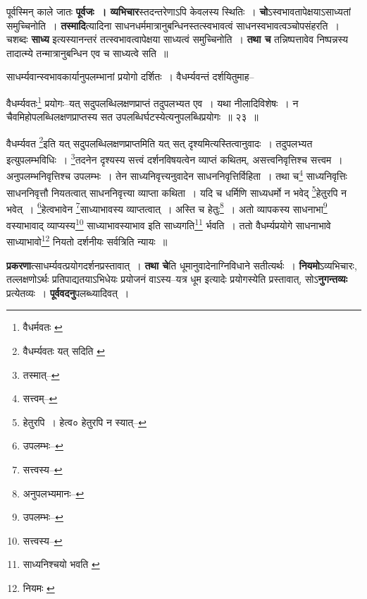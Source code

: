 \documentclass[article,12pt,a4paper]{memoir}
\begin{document}
	  \pstart पूर्वस्मिन् काले जातः \textbf{पूर्वजः । व्यभिचार}स्तदन्तरेणाऽपि केवलस्य स्थितिः । \textbf{चो}ऽस्वभावतापेक्षयाऽसाध्यतां समुच्चिनोति । \textbf{तस्मादि}त्यादिना साधनधर्ममात्रानुबन्धिनस्तत्स्वभावत्वं साधनस्वभावत्वञ्चोपसंहरति । चशब्दः \textbf{साध्य} इत्यस्यानन्तरं तत्स्वभावत्वापेक्षया साध्यत्वं समुच्चिनोति । \textbf{तथा च} तन्निष्पत्तावेव निष्पन्नस्य तादात्म्ये तन्मात्रानुबन्धिन एव च साध्यत्वे सति ॥
	\pend
	  \bigskip
	  \begingroup
	

	  \pstart साधर्म्यवान्स्वभावकार्यानुपलम्भानां प्रयोगो दर्शितः । वैधर्म्यवन्तं दर्शयितुमाह--
	\pend
       
	  \bigskip
	  \begingroup
	

	  \pstart वैधर्म्यवतः\footnote{वैधर्मवतः \cite{dp-edE}} प्रयोगः--यत् सदुपलब्धिलक्षणप्राप्तं तदुपलभ्यत एव । यथा नीलादिविशेषः । न चैवमिहोपलब्धिलक्षणप्राप्तस्य सत उपलब्धिर्घटस्येत्यनुपलब्धिप्रयोगः ॥ २३ ॥
	\pend
      
	  \endgroup
	 

	  \pstart वैधर्म्यवत \footnote{वैधर्म्यवतः यत् सदिति \cite{dp-msC}}\-इति यत् सदुपलब्धिलक्षणप्राप्तमिति यत् सत् दृश्यमित्यस्तित्वानुवादः । तदुपलभ्यत इत्युपलम्भविधिः । \footnote{तस्मात्--\cite{dp-msD-n}}\-तदनेन दृश्यस्य सत्त्वं दर्शनविषयत्वेन व्याप्तं कथितम्, असत्त्वनिवृत्तिश्च सत्त्वम । अनुपलम्भनिवृत्तिश्च उपलम्भः । तेन साध्यनिवृत्त्यनुवादेन साधननिवृत्तिर्विहिता । तथा च\footnote{सत्त्वम्--\cite{dp-msD-n}} साध्यनिवृत्तिः साधननिवृत्तौ नियतत्वात् साधननिवृत्त्या व्याप्ता कथिता । यदि च धर्मिणि साध्यधर्मो न भवेद् \footnote{हेतुरपि । हेत्व० \cite{dp-msB} \cite{dp-edP} \cite{dp-edH} हेतुरपि न स्यात्--\cite{dp-msD}}\-हेतुरपि न भवेत् । \footnote{उपलम्भः--\cite{dp-msD-n}}\-हेत्वभावेन \footnote{सत्त्वस्य--\cite{dp-msD-n}}\-साध्याभावस्य व्याप्तत्वात् । अस्ति च हेतुः\footnote{अनुपलभ्यमानः--\cite{dp-msD-n}} । अतो व्यापकस्य साधनाभा\footnote{उपलम्भः--\cite{dp-msD-n}} वस्याभावाद् व्याप्यस्य\footnote{सत्त्वस्य--\cite{dp-msD-n}} साध्याभावस्याभाव इति साध्यगति\footnote{साध्यनिश्चयो भवति \cite{dp-msA} \cite{dp-msB} \cite{dp-msC} \cite{dp-msD} \cite{dp-edP} \cite{dp-edH} \cite{dp-edE} \cite{dp-edN}} र्भवति । ततो वैधर्म्यप्रयोगे साधनाभावे साध्याभावो\footnote{नियमः \cite{dp-msB}} नियतो दर्शनीयः सर्वत्रिति न्यायः ॥
	\pend
      
	  \endgroup
	

	  \pstart \textbf{प्रकरणा}त्साधर्म्यवत्प्रयोगदर्शनप्रस्तावात् । \textbf{तथा चे}ति धूमानुवादेनाग्निविधाने सतीत्यर्थः । \textbf{नियमो}ऽव्यभिचारः, तल्लक्षणोऽर्थः प्रतिपाद्यतयाऽभिधेयः प्रयोजनं वाऽस्य--यत्र धूम इत्यादेः प्रयोगस्येति प्रस्तावात्, सोऽ\textbf{नुगन्तव्यः} प्रत्येतव्यः । \textbf{पूर्ववदनु}पलब्ध्यादिवत् ।
	\pend
      
\end{document}
